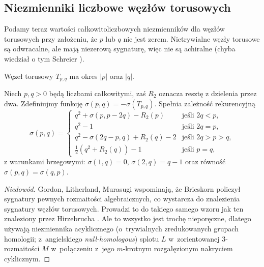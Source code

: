 
\subsection{Niezmienniki liczbowe węzłów torusowych}
Podamy teraz wartości całkowitoliczbowych niezmienników dla węzłów torusowych przy założeniu, że $p$ lub $q$ nie jest zerem.
Nietrywialne węzły torusowe są odwracalne, ale mają niezerową sygnaturę, więc nie są achiralne (chyba wiedział o tym Schreier \cite{schreier24}).

\begin{proposition}
%
    Węzeł torusowy $T_{p, q}$ ma okres $|p|$ oraz $|q|$.
\end{proposition}

\begin{proposition}
%
    Niech $p, q > 0$ będą liczbami całkowitymi, zaś $R_2$ oznacza resztę z dzielenia przez dwa.
    Zdefiniujmy funkcję $\sigma(p, q) = - \sigma(T_{p, q})$.
    Spełnia zależność rekurencyjną
    \begin{equation}
        \sigma(p, q) = \begin{cases}
             q^2 + \sigma(p, p - 2q) - R_2(p)       & \text{jeśli } 2q < p, \\
             q^2 - 1                              & \text{jeśli } 2q = p, \\
             q^2 - \sigma(2q - p, q) + R_2(q) - 2 & \text{jeśli } 2q > p > q, \\
             \frac 12 (q^2 + R_2(q)) - 1                 & \text{jeśli } p = q,
        \end{cases}
    \end{equation}
    z warunkami brzegowymi: $\sigma(1, q) = 0$, $\sigma(2, q) = q-1$ oraz równość $\sigma(p, q) = \sigma(q, p)$.
\end{proposition}

\begin{proof}[Niedowód]
%
%
%
%
%
    Gordon, Litherland, Murasugi \cite[tw. 5.2]{litherland81} wspominają, że Brieskorn \cite{brieskorn66} policzył sygnatury pewnych rozmaitości algebraicznych, co wystarcza do znalezienia sygnatury węzłów torusowych.
    Prowadzi to do takiego samego wzoru jak ten znaleziony przez Hirzebrucha \cite{hirzebruch68}.
    Ale to wszystko jest trochę nieporęczne, dlatego używają niezmiennika acyklicznego (o~trywialnych zredukowanych grupach homologii; z~angielskiego \emph{null-homologous}) splotu $L$ w~zorientowanej 3-rozmaitości $M$ w~połączeniu z~jego $m$-krotnym rozgałęzionym nakryciem cyklicznym.
%
\end{proof}

